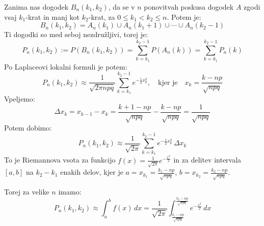 \documentclass[12pt]{book}
\theoremstyle{definition}
\theoremstyle{plain}
\theoremstyle{plain}
\theoremstyle{plain}
\theoremstyle{remark}
\begin{document}
\begin{enumerate}[label=(\alph*)]
    Zanima nas dogodek $B_n\left(k_1, k_2\right)$, da se v $n$ ponovitvah poskusa dogodek $A$ zgodi vsaj $k_1$-krat in manj kot $k_2$-krat, za $0 \leq k_1 < k_2 \leq n$. Potem je: 
    $$
    B_n\left(k_1, k_2\right)=A_n\left(k_1\right) \cup A_n\left(k_1+1\right) \cup \cdots \cup A_n\left(k_2-1\right)
    $$
    Ti dogodki so med seboj nezdružljivi, torej je:
    $$
    P_n\left(k_1, k_2\right):=P\left(B_n\left(k_1, k_2\right)\right)=\sum_{k=k_1}^{k_2-1}P\left(A_n(k)\right)=\sum_{k=k_1}^{k_2-1} P_n(k)
    $$
    Po Laplaceovi lokalni formuli je potem: 
    $$
    P_n\left(k_1, k_2\right) \approx \frac{1}{\sqrt{2 \pi n p q}} \sum_{k=k_1}^{k_2-1} e^{-\frac{1}{2}x_k^2}, \quad \text{kjer je} \quad x_k=\frac{k-n p}{\sqrt{n p q}}
    $$ 
    Vpeljemo:
    $$
    \Delta x_k=x_{k-1}-x_k=\frac{k+1-n p}{\sqrt{n p q}}-\frac{k-n p}{\sqrt{n p q}}=\frac{1}{\sqrt{n p q}}
    $$
    Potem dobimo: 
    $$
    P_n\left(k_1, k_2\right) \approx \frac{1}{\sqrt{2 \pi}} \sum_{k=k_1}^{k_2-1} e^{-\frac{1}{2} x_k^2} \, \Delta x_k
    $$
    To je Riemannova vsota za funkcijo $f(x)=\frac{1}{\sqrt{2 \pi}} e^{-\frac{x^2}{2}}$ in za delitev intervala $[a,b]$ na $k_2 -k_1$ enakih delov, kjer je $a=x_{k_1}=\frac{k_1-n p}{\sqrt{n p q}}$, $b=x_{k_2}=\frac{k_2-n p}{\sqrt{n p q}}$.

    \begin{figure}[H]
        \centering

        \label{fig:5}
    \end{figure}

    Torej za velike $n$ imamo: 
    $$
    P_n\left(k_1, k_2\right) \approx \int_a^b f(x) \, d x= \frac{1}{\sqrt{2 \pi}} \int_{\frac{k_1-n p}{\sqrt{n p q}}}^{\frac{k_2-n p}{\sqrt{n p q}}} e^{-\frac{x^2}{2}} \, d x
    $$
    \begin{figure}[H]
        \centering
        \begin{tikzpicture}


\end{tikzpicture}
\end{figure}
\end{enumerate}
\end{document}

